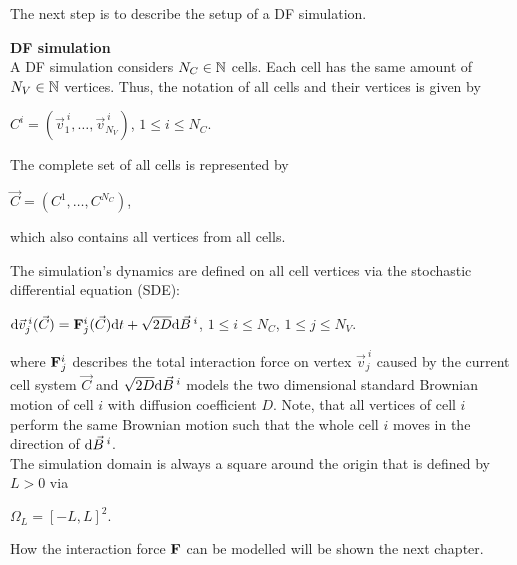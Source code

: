 The next step is to describe the setup of a DF simulation. 
\begin{definition} \textbf{DF simulation} \label{def:DF-Sim}  \\
	A DF simulation considers $N_C \in \mathbb{N}$ cells. 
	Each cell has the same amount of $N_V \in \mathbb{N}$ vertices.
	Thus, the notation of all cells and their vertices is given by 
	\begin{center}
		$C^{i} = (\vec{v}^{\:i}_1, \ldots, \vec{v}^{\:i}_{N_V})$, \hspace{0.5em} $1 \leq i \leq N_{C}$. 
	\end{center}

	The complete set of all cells is represented by 
	\begin{center}
		$\vec{C} = (C^{1}, \ldots, C^{N_C})$,
	\end{center}
	which also contains all vertices from all cells.

	The simulation's dynamics are defined on all cell vertices via the stochastic differential equation (SDE):
	\begin{center}
		$ \mathrm{d} \vec{v}^{\:i}_j(\vec{C}) = \mathbf{F}^i_j(\vec{C}) \mathrm{d} t + \sqrt{2 D} \mathrm{d} \vec{B}^{\:i}$, \hspace{0.5em} $1 \leq i \leq N_{C}$, \hspace{0.5em} $1 \leq j \leq N_{V}$. 
	\end{center}
	where $\mathbf{F}^i_j$ describes the total interaction force on vertex $\vec{v}^{\:i}_j$ caused by the current cell system $\vec{C}$ and $\sqrt{2 D} \mathrm{d} \vec{B}^{\:i}$ models the two dimensional standard Brownian motion of cell $i$ with diffusion coefficient $D$.  
	Note, that all vertices of cell $i$ perform the same Brownian motion such that the whole cell $i$ moves in the direction of $\mathrm{d} \vec{B}^{\:i}$. \\

	The simulation domain is always a square around the origin that is defined by $L > 0$ via 
	\begin{center}
		$
		\Omega_L = [-L, L]^2.
		$
	\end{center} 
\end{definition}

How the interaction force $\mathbf{F}$ can be modelled will be shown the next chapter. 




